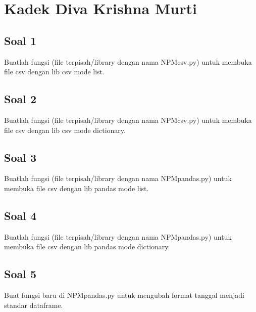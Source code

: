 \section{Kadek Diva Krishna Murti}
\subsection{Soal 1}
Buatlah  fungsi  (file  terpisah/library  dengan  nama  NPMcsv.py)  untuk  membuka file csv dengan lib csv mode list.



\subsection{Soal 2}
Buatlah  fungsi  (file  terpisah/library  dengan  nama  NPMcsv.py)  untuk  membuka file csv dengan lib csv mode dictionary.



\subsection{Soal 3}
Buatlah fungsi (file terpisah/library dengan nama NPMpandas.py) untuk membuka file csv dengan lib pandas mode list.



\subsection{Soal 4}
Buatlah fungsi (file terpisah/library dengan nama NPMpandas.py) untuk membuka file csv dengan lib pandas mode dictionary.



\subsection{Soal 5}
Buat fungsi baru di NPMpandas.py untuk mengubah format tanggal menjadi standar dataframe.

